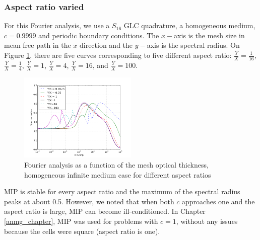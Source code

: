 \subsubsection{Aspect ratio varied}
For this Fourier analysis, we use a $S_{16}$ GLC quadrature, a homogeneous
medium, $c=0.9999$ and periodic boundary conditions. The $x-$axis is the mesh
size in mean free path in the $x$ direction and the $y-$axis is the spectral
radius. On Figure \ref{fig_fa_ar}, there are five curves corresponding to five 
different aspect ratio: $\frac{Y}{X}=\frac{1}{16}$, $\frac{Y}{X}=\frac{1}{4}$, 
$\frac{Y}{X}=1$, $\frac{Y}{X}=4$, $\frac{Y}{X}=16$, and $\frac{Y}{X}=100$. 
\begin{figure}[H]
  \centering
  \includegraphics[width=0.5\textwidth]{./Dsa/aspect_ratio_9999_2}
  \caption{Fourier analysis as a function of the mesh optical thickness,
  homogeneous infinite medium case for different aspect ratios}
  \label{fig_fa_ar}
\end{figure}
MIP is stable for every aspect ratio and the maximum of the spectral radius
peaks at about 0.5. However, we noted that when both $c$ 
approaches one and the aspect ratio is large, MIP can become ill-conditioned. 
In Chapter \ref{anmg_chapter}, MIP was used for problems with $c=1$, without any issues 
because the cells were square (aspect ratio is one).

